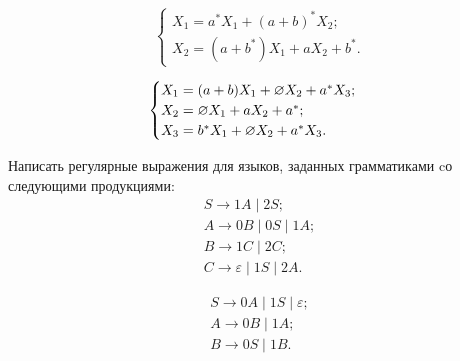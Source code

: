 \begin{equation}
    \begin{cases}
        X_1 = a^{\ast}X_1 + (a+b)^{\ast}X_2;\\
        X_2 = (a+b^{\ast})X_1 + aX_2 + b^\ast.
    \end{cases}
\end{equation}

\begin{equation}
    \begin{cases}
        X_1 = (a+b)X_1 + \varnothing X_2 + a^{\ast}X_3; \\
        X_2 = \varnothing X_1 + aX_2 + a^{\ast}; \\
        X_3 = b^{\ast}X_1 + \varnothing X_2 + a^{\ast}X_3.
    \end{cases}
\end{equation}

Написать регулярные выражения для языков, заданных грамматиками cо
следующими продукциями:
\begin{equation}
\begin{array}{l}
S \to 1A \mid 2S; \\
A \to 0B \mid 0S \mid 1A; \\
B \to 1C \mid 2C; \\
C \to \varepsilon \mid 1S \mid 2A.
\end{array}
\end{equation}

\begin{equation}
\begin{array}{l}
S \to 0A \mid 1S \mid \varepsilon ;\\
A \to 0B \mid 1A;\\
B \to 0S \mid 1B.
\end{array}
\end{equation}